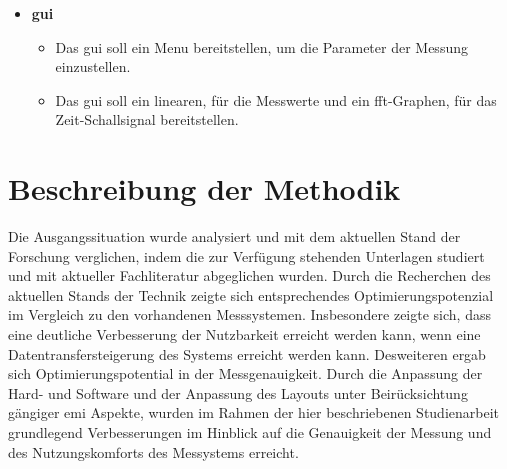 \begin{itemize}\itemsep0pt
	\item \textbf{\ac{gui}}
	\begin{itemize}\itemsep0pt
		\item Das \ac{gui} soll ein Menu bereitstellen, um die Parameter der Messung einzustellen.
		\item Das \ac{gui} soll ein linearen, für die Messwerte und ein \ac{fft}-Graphen, für das Zeit-Schallsignal bereitstellen.
	\end{itemize}
\end{itemize}
%
%
%
\section{Beschreibung der Methodik}
Die Ausgangssituation wurde analysiert und mit dem aktuellen Stand der Forschung verglichen, indem die zur Verfügung stehenden Unterlagen studiert und mit aktueller Fachliteratur abgeglichen wurden. Durch die Recherchen des aktuellen Stands der Technik zeigte sich entsprechendes Optimierungspotenzial im Vergleich zu den vorhandenen Messsystemen. Insbesondere zeigte sich, dass eine deutliche Verbesserung der Nutzbarkeit erreicht werden kann, wenn eine Datentransfersteigerung des Systems erreicht werden kann. Desweiteren ergab sich Optimierungspotential in der Messgenauigkeit. Durch die Anpassung der Hard- und Software und der Anpassung des Layouts unter Beirücksichtung gängiger \ac{emi} Aspekte, wurden im Rahmen der hier beschriebenen Studienarbeit grundlegend Verbesserungen im Hinblick auf die Genauigkeit der Messung und des Nutzungskomforts des Messystems erreicht.